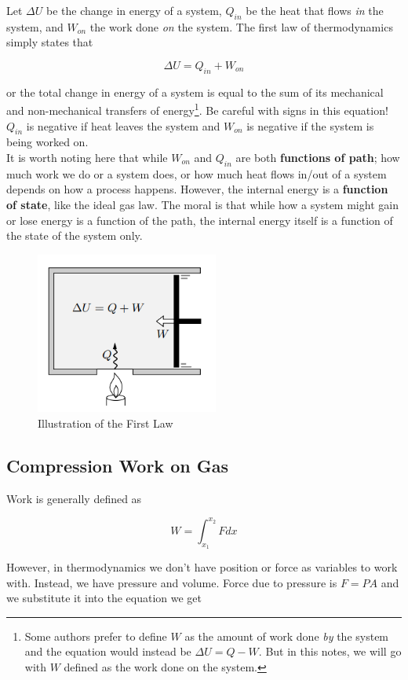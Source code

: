 \documentclass[12pt, a4paper]{article}
\begin{document}
Let $\Delta U$ be the change in energy of a system, $Q_{in}$ be the heat that flows \textit{in} the system, and $W_{on}$ the work done \textit{on} the system. The first law of thermodynamics simply states that

\[ \Delta U=Q_{in}+W_{on} \]

or the total change in energy of a system is equal to the sum of its mechanical and non-mechanical transfers of energy\footnote{Some authors prefer to define $W$ as the amount of work done \textit{by} the system and the equation would instead be \( \Delta U=Q-W \). But in this notes, we will go with $W$ defined as the work done on the system.}. Be careful with signs in this equation! $Q_{in}$ is negative if heat leaves the system and $W_{on}$ is negative if the system is being worked on. \\

It is worth noting here that while $W_{on}$ and $Q_{in}$ are both \textbf{functions of path}; how much work we do or a system does, or how much heat flows in/out of a system depends on how a process happens. However, the internal energy is a \textbf{function of state}, like the ideal gas law. The moral is that while how a system might gain or lose energy is a function of the path, the internal energy itself is a function of the state of the system only.

\begin{figure}[H]
\centering
\includegraphics[width=60mm]{23.png}
\caption{Illustration of the First Law}
\end{figure}

\subsection{Compression Work on Gas}

Work is generally defined as

$$W = \int_{x_1}^{x_2} Fdx$$

However, in thermodynamics we don't have position or force as variables to work with. Instead, we have pressure and volume. Force due to pressure is $F = PA$ and we substitute it into the equation we get
\end{document}

